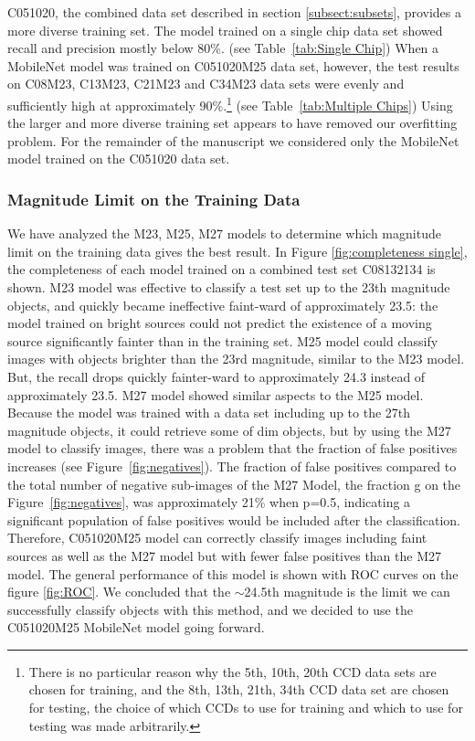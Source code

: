 \documentclass{aastex631}
\begin{document}
C051020, the combined data set described in section \ref{subsect:subsets}, provides a more diverse training set. 
The model trained on a single chip data set showed recall and precision mostly below 80\%. (see Table~\ref{tab:Single Chip})
When a MobileNet model was trained on C051020M25 data set, however, the test results on C08M23, C13M23, C21M23 and C34M23 data sets were evenly and sufficiently high at approximately 90\%.\footnote{There is no particular reason why the 5th, 10th, 20th CCD data sets are chosen for training, and the 8th, 13th, 21th, 34th CCD data set are chosen for testing, the choice of which CCDs to use for training and which to use for testing was made arbitrarily.} (see Table~\ref{tab:Multiple Chips})
Using the larger and more diverse training set appears to have removed our overfitting problem.
For the remainder of the manuscript we considered only the MobileNet model trained on the C051020 data set.

\subsubsection{Magnitude Limit on the Training Data}
\label{subsubsect: Magnitude Limit on the Training Data}
We have analyzed the M23, M25, M27 models to determine which magnitude limit on the training data gives the best result.
In Figure \ref{fig:completeness single}, the completeness of each model trained on a combined test set C08132134 is shown.
M23 model was effective to classify a test set up to the 23th magnitude objects, and quickly became ineffective faint-ward of approximately 23.5: the model trained on bright sources could not predict the existence of a moving source significantly fainter than in the training set.
M25 model could classify images with objects brighter than the 23rd magnitude, similar to the M23 model.
But, the recall drops quickly fainter-ward to approximately 24.3 instead of approximately 23.5.
M27 model showed similar aspects to the M25 model.
Because the model was trained with a data set including up to the 27th magnitude objects, it could retrieve some of dim objects, but by using the M27 model to classify images, there was a problem that the fraction of false positives increases (see Figure~\ref{fig:negatives}).
The fraction of false positives compared to the total number of negative sub-images of the M27 Model, the fraction g on the Figure~\ref{fig:negatives}, was approximately 21\% when p=0.5, indicating a significant population of false positives would be included after the classification.
Therefore, C051020M25 model can correctly classify images including faint sources as well as the M27 model but with fewer false positives than the M27 model.
The general performance of this model is shown with ROC curves on the figure \ref{fig:ROC}.
We concluded that the $\sim$24.5th magnitude is the limit we can successfully classify objects with this method, and we decided to use the C051020M25 MobileNet model going forward.
\end{document}
